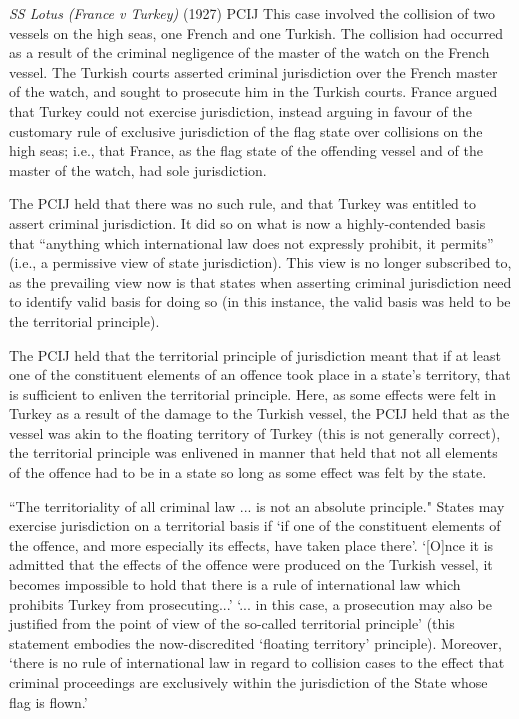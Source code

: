 \begin{casedetails}{\textit{SS Lotus (France v Turkey)} (1927) PCIJ}
    \flushleft
    This case involved the collision of two vessels on the high seas, one French and one Turkish. The collision had occurred as a result of the criminal negligence of the master of the watch on the French vessel. The Turkish courts asserted criminal jurisdiction over the French master of the watch, and sought to prosecute him in the Turkish courts. France argued that Turkey could not exercise jurisdiction, instead arguing in favour of the customary rule of exclusive jurisdiction of the flag state over collisions on the high seas; i.e., that France, as the flag state of the offending vessel and of the master of the watch, had sole jurisdiction.

    \tcblower
    \flushleft

    The PCIJ held that there was no such rule, and that Turkey was entitled to assert criminal jurisdiction. It did so on what is now a highly-contended basis that ``anything which international law does not expressly prohibit, it permits'' (i.e., a permissive view of state jurisdiction). This view is no longer subscribed to, as the prevailing view now is that states when asserting criminal jurisdiction need to identify  valid basis for doing so (in this instance, the valid basis was held to be the territorial principle).

    \vspace{\baselineskip}

    The PCIJ held that the territorial principle of jurisdiction meant that if at least one of the constituent elements of an offence took place in a state's territory, that is sufficient to enliven the territorial principle. Here, as some effects were felt in Turkey as a result of the damage to the Turkish vessel, the PCIJ held that as the vessel was akin to the floating territory of Turkey (this is not generally correct), the territorial principle was enlivened in manner that held that not all elements of the offence had to be in a state so long as some effect was felt by the state.

    \vspace{\baselineskip}

    ``The territoriality of all criminal law ... is not an absolute principle." States may exercise jurisdiction on a territorial basis if `if one of the constituent elements of the offence, and more especially its effects, have taken place there'. `[O]nce it is admitted that the effects of the offence were produced on the Turkish vessel, it becomes impossible to hold that there is a rule of international law which prohibits Turkey from prosecuting...' `... in this case, a prosecution may also be justified from the point of view of the so-called territorial principle' (this statement embodies the now-discredited `floating territory' principle). Moreover, `there is no rule of international law in regard to collision cases to the effect that criminal proceedings are exclusively within the jurisdiction of the State whose flag is flown.'


\end{casedetails}

